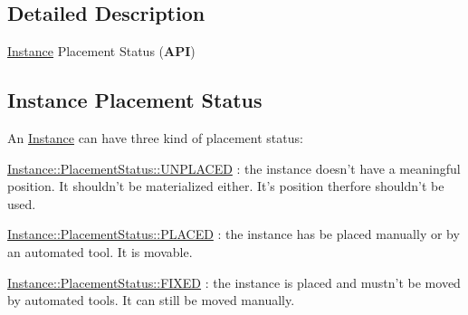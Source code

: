 \subsection{Detailed Description}
\hyperlink{classHurricane_1_1Instance}{Instance} Placement Status ({\bfseries A\-P\-I}) 

\hypertarget{classHurricane_1_1Instance_1_1PlacementStatus_secInstancePStatus}{}\subsection{Instance Placement Status}\label{classHurricane_1_1Instance_1_1PlacementStatus_secInstancePStatus}
An \hyperlink{classHurricane_1_1Instance}{Instance} can have three kind of placement status\-:
\begin{DoxyItemize}
\item \hyperlink{classHurricane_1_1Instance_1_1PlacementStatus_af76cc0838783b3eb3a515eb3c3e0f7bfa3e19a0a1b3e8c8fd860164df7f935216}{Instance\-::\-Placement\-Status\-::\-U\-N\-P\-L\-A\-C\-E\-D} \-: the instance doesn't have a meaningful position. It shouldn't be materialized either. It's position therfore shouldn't be used.
\item \hyperlink{classHurricane_1_1Instance_1_1PlacementStatus_af76cc0838783b3eb3a515eb3c3e0f7bfaf3589c11ecd7d5de63db24826b74d457}{Instance\-::\-Placement\-Status\-::\-P\-L\-A\-C\-E\-D} \-: the instance has be placed manually or by an automated tool. It is movable.
\item \hyperlink{classHurricane_1_1Instance_1_1PlacementStatus_af76cc0838783b3eb3a515eb3c3e0f7bfa47be8a40f04081635fe24485ae7c6bd7}{Instance\-::\-Placement\-Status\-::\-F\-I\-X\-E\-D} \-: the instance is placed and mustn't be moved by automated tools. It can still be moved manually. 
\end{DoxyItemize}

